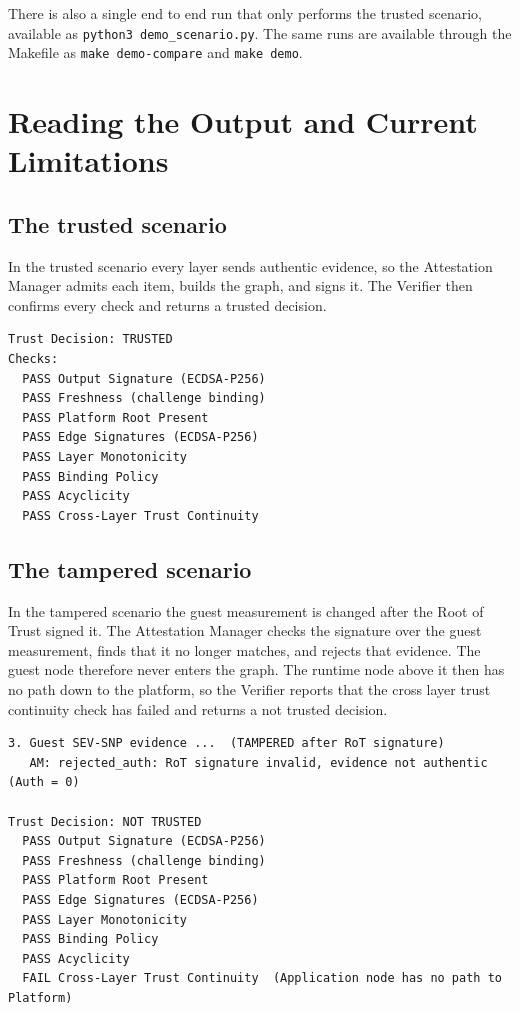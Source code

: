 \documentclass[11pt,a4paper]{article}
\begin{document}
There is also a single end to end run that only performs the trusted scenario,
available as \texttt{python3 demo\_scenario.py}. The same runs are available
through the Makefile as \texttt{make demo-compare} and \texttt{make demo}.

\section{Reading the Output and Current Limitations}

\subsection{The trusted scenario}

In the trusted scenario every layer sends authentic evidence, so the Attestation
Manager admits each item, builds the graph, and signs it. The Verifier then
confirms every check and returns a trusted decision.

\begin{lstlisting}
Trust Decision: TRUSTED
Checks:
  PASS Output Signature (ECDSA-P256)
  PASS Freshness (challenge binding)
  PASS Platform Root Present
  PASS Edge Signatures (ECDSA-P256)
  PASS Layer Monotonicity
  PASS Binding Policy
  PASS Acyclicity
  PASS Cross-Layer Trust Continuity
\end{lstlisting}

\subsection{The tampered scenario}

In the tampered scenario the guest measurement is changed after the Root of Trust
signed it. The Attestation Manager checks the signature over the guest
measurement, finds that it no longer matches, and rejects that evidence. The
guest node therefore never enters the graph. The runtime node above it then has
no path down to the platform, so the Verifier reports that the cross layer trust
continuity check has failed and returns a not trusted decision.

\begin{lstlisting}
3. Guest SEV-SNP evidence ...  (TAMPERED after RoT signature)
   AM: rejected_auth: RoT signature invalid, evidence not authentic (Auth = 0)

Trust Decision: NOT TRUSTED
  PASS Output Signature (ECDSA-P256)
  PASS Freshness (challenge binding)
  PASS Platform Root Present
  PASS Edge Signatures (ECDSA-P256)
  PASS Layer Monotonicity
  PASS Binding Policy
  PASS Acyclicity
  FAIL Cross-Layer Trust Continuity  (Application node has no path to Platform)
\end{lstlisting}
\end{document}
